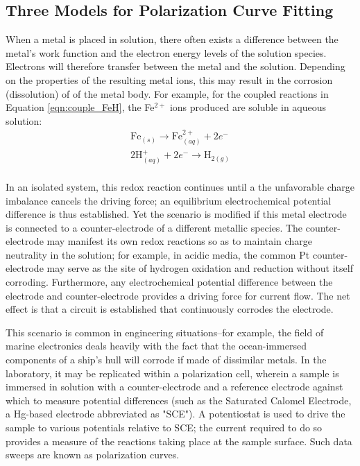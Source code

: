 \subsection{Three Models for Polarization Curve Fitting}

When a metal is placed in solution, there often exists a difference between the metal's work function and the electron energy levels of the solution species.  Electrons will therefore transfer between the metal and the solution. Depending on the properties of the resulting metal ions, this may result in the corrosion (dissolution) of of the metal body.\cite{devine}  For example, for the coupled reactions in Equation \ref{eqn:couple_FeH}, the Fe$^{2+}$ ions produced are soluble in aqueous solution:
%
	\begin{equation}
	\begin{split}
		\text{Fe}_{(s)} \rightarrow \text{Fe}_{(aq)}^{2+} + 2 e^- \\
		2 \text{H}^+_{(aq)} + 2 e^- \rightarrow \text{H}_{2(g)} \\
	\end{split}
	\label{eqn:couple_FeH}
	\end{equation}
%

In an isolated system, this redox reaction continues until a the unfavorable charge imbalance cancels the driving force; an equilibrium electrochemical potential difference is thus established.  Yet the scenario is modified if this metal electrode is connected to a counter-electrode of a different metallic species.  The counter-electrode may manifest its own redox reactions so as to maintain charge neutrality in the solution; for example, in acidic media, the common Pt counter-electrode may serve as the site of hydrogen oxidation and reduction without itself corroding.  Furthermore, any electrochemical potential difference between the electrode and counter-electrode provides a driving force for current flow.  The net effect is that a circuit is established that continuously corrodes the electrode.\cite{devine}

This scenario is common in engineering situations--for example, the field of marine electronics deals heavily with the fact that the ocean-immersed components of a ship's hull will corrode if made of dissimilar metals.  In the laboratory, it may be replicated within a polarization cell, wherein a sample is immersed in solution with a counter-electrode and a reference electrode against which to measure potential differences (such as the Saturated Calomel Electrode, a Hg-based electrode abbreviated as "SCE").  A potentiostat is used to drive the sample to various potentials relative to SCE; the current required to do so provides a measure of the reactions taking place at the sample surface.  Such data sweeps are known as polarization curves.\cite{gsi}

